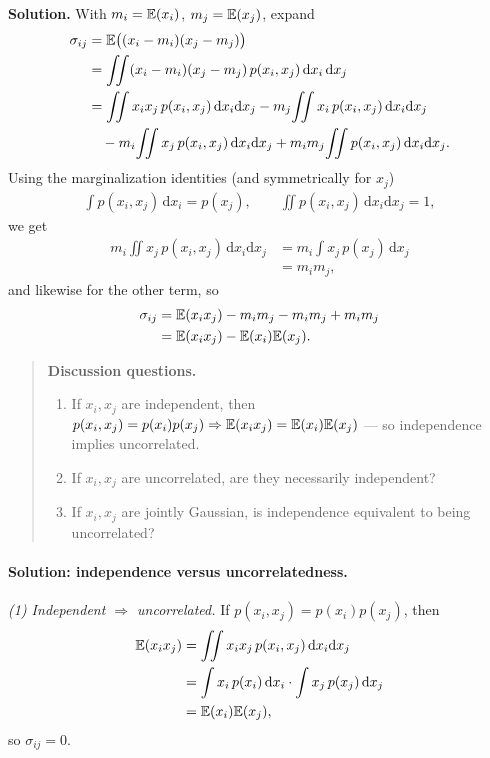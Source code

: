 \textbf{Solution.} With $m_i = \mathbb{E}(x_i)$, $m_j=\mathbb{E}(x_j)$, expand
\begin{align}
\sigma_{ij}
&= \mathbb{E}\big((x_i-m_i)(x_j-m_j)\big) \\
&= \iint (x_i-m_i)(x_j-m_j)\,p(x_i,x_j)\,\mathrm{d}x_i\,\mathrm{d}x_j \\
&= \iint x_i x_j\, p(x_i,x_j)\,\mathrm{d}x_i\mathrm{d}x_j
 - m_j\!\iint x_i\, p(x_i,x_j)\,\mathrm{d}x_i\mathrm{d}x_j \notag\\
&\quad - m_i\!\iint x_j\, p(x_i,x_j)\,\mathrm{d}x_i\mathrm{d}x_j
 + m_i m_j\!\iint p(x_i,x_j)\,\mathrm{d}x_i\mathrm{d}x_j.
\end{align}
Using the marginalization identities (and symmetrically for $x_j$)
\begin{align}
\int p(x_i,x_j)\,\mathrm{d}x_i = p(x_j), \qquad
\iint p(x_i,x_j)\,\mathrm{d}x_i\mathrm{d}x_j = 1,
\end{align}
we get
\begin{align}
m_i\!\iint x_j\, p(x_i,x_j)\,\mathrm{d}x_i\mathrm{d}x_j
&= m_i\!\int x_j\, p(x_j)\,\mathrm{d}x_j \\
&= m_i m_j,
\end{align}
and likewise for the other term, so
\begin{align}
\sigma_{ij} &= \mathbb{E}(x_i x_j) - m_i m_j - m_i m_j + m_i m_j \\
&= \mathbb{E}(x_i x_j) - \mathbb{E}(x_i)\mathbb{E}(x_j).
\end{align}

\begin{quote}
\textbf{Discussion questions.}
\begin{enumerate}[itemsep=0.2em]
\item If $x_i,x_j$ are independent, then $p(x_i,x_j)=p(x_i)p(x_j) \Rightarrow \mathbb{E}(x_i x_j)=\mathbb{E}(x_i)\mathbb{E}(x_j)$ --- so independence implies uncorrelated.
\item If $x_i,x_j$ are uncorrelated, are they necessarily independent?
\item If $x_i,x_j$ are jointly Gaussian, is independence equivalent to being uncorrelated?
\end{enumerate}
\end{quote}

\paragraph{Solution: independence versus uncorrelatedness.}
\emph{(1) Independent $\Rightarrow$ uncorrelated.} If $p(x_i,x_j)=p(x_i)p(x_j)$, then
\begin{align}
\mathbb{E}(x_i x_j) &= \iint x_i x_j\, p(x_i,x_j)\,\mathrm{d}x_i\mathrm{d}x_j \\
&= \int x_i\, p(x_i)\,\mathrm{d}x_i \cdot \int x_j\, p(x_j)\,\mathrm{d}x_j \\
&= \mathbb{E}(x_i)\mathbb{E}(x_j),
\end{align}
so $\sigma_{ij}=0$.

